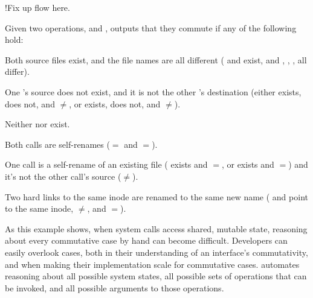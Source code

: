 \XXX!{Fix up flow here.}

Given two
 operations,  and ,
\analyzer outputs that they commute if any of the following hold:

\begin{CompactItemize}
\item Both source files exist, and the file names are all different
      ( and  exist, and , , ,
       all differ).

\item One 's source does not exist, and it is not the
      other 's destination (either
       exists,  does not, and $\neq$, or
       exists,  does not, and $\neq$).

\item Neither  nor  exist.

\item Both calls are self-renames ($=$ and $=$).

\item One call is a self-rename of an existing file
      ( exists and $=$, or
        exists and $=$) and
      it's not the other call's source ($\neq$).

\item Two hard links to the same inode are renamed to the same new name
      ( and  point to the same inode,
       $\neq$, and $=$).

\end{CompactItemize}

As this example shows, when system calls access shared, mutable
state, reasoning about every commutative case by hand can become
difficult.
%
Developers can easily overlook cases, both in their
understanding of an interface's commutativity, and when making their
implementation scale for commutative cases.
%
\analyzer
automates reasoning about all possible system states, all possible
sets of operations that can be
invoked, and all possible arguments to those operations.



